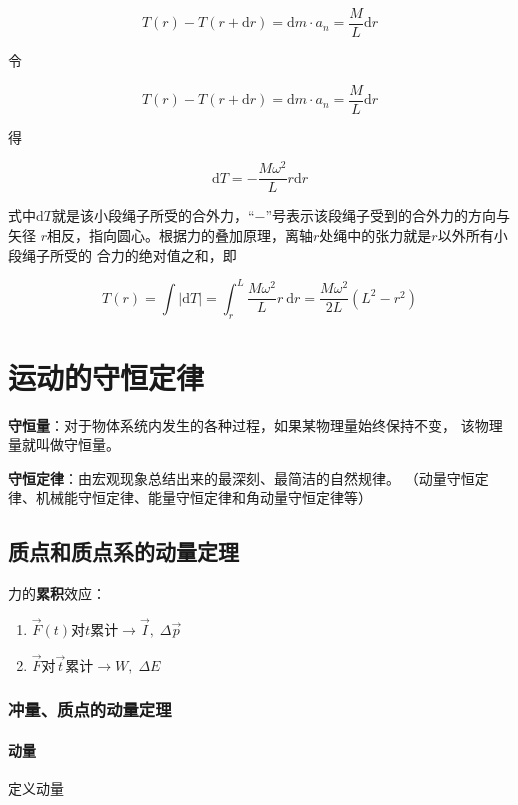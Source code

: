 \documentclass[
	12pt, %
	a4paper, %
]{myLegrandOrangeBook}
\newcommand{\rmd}{\mathrm{d}}
\begin{document}
    $$
        T(r)-T(r+\rmd r)=\rmd m \cdot a_n=\frac{M}{L} \rmd r
    $$

    令

    $$
        T(r)-T(r+\rmd r)=\rmd m \cdot a_n=\frac{M}{L} \rmd r
    $$

    得

    $$
        \rmd T=-\frac{M \omega^2}{L} r \rmd r
    $$

    式中\(\rmd T\)就是该小段绳子所受的合外力，“\(-\)”号表示该段绳子受到的合外力的方向与矢径
    \(r\)相反，指向圆心。根据力的叠加原理，离轴\(r\)处绳中的张力就是\(r\)以外所有小段绳子所受的
    合力的绝对值之和，即

    $$
        T(r)=\int|\mathrm{d} T|=\int_r^L \frac{M \omega^2}{L} r \mathrm{~d} r=\frac{M \omega^2}{2 L}\left(L^2-r^2\right)
    $$

\chapter{运动的守恒定律}

\textbf{守恒量}：对于物体系统内发生的各种过程，如果某物理量始终保持不变，
该物理量就叫做守恒量。

\textbf{守恒定律}：由宏观现象总结出来的最深刻、最简洁的自然规律。
（动量守恒定律、机械能守恒定律、能量守恒定律和角动量守恒定律等）

\section{质点和质点系的动量定理}

力的\textbf{累积}效应：

\begin{enumerate}
    \item \(\overrightarrow{F}\left(t\right)\)对\(t\)累计\(\rightarrow \overrightarrow{I},\; \Delta \overrightarrow{p}\)
    \item \(\overrightarrow{F}\)对\(\overrightarrow{t}\)累计\(\rightarrow W,\; \Delta E\)
\end{enumerate}

\subsection{冲量、质点的动量定理}

\subsubsection{动量}

定义动量
\end{document}
